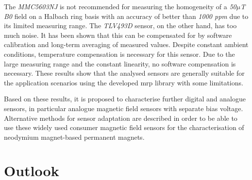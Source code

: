 The \emph{MMC5603NJ} is not recommended for measuring the homogeneity of
a \emph{50\(\mu\)T} \emph{B0} field on a Halbach ring basis with an
accuracy of better than \emph{1000 \gls{ppm}} due to its limited
measuring range. The \emph{TLV493D} sensor, on the other hand, has too
much noise. It has been shown that this can be compensated for by
software calibration and long-term averaging of measured values. Despite
constant ambient conditions, temperature compensation is necessary for
this sensor. Due to the large measuring range and the constant
linearity, no software compensation is necessary. These results show
that the analysed sensors are generally suitable for the application
scenarios using the developed \gls{mrp} library with some limitations.

Based on these results, it is proposed to characterise further digital
and analogue sensors, in particular analogue magnetic field sensors with
separate bias voltage. Alternative methods for sensor adaptation are
described in order to be able to use these widely used consumer magnetic
field sensors for the characterisation of neodymium magnet-based
permanent magnets.

\hypertarget{outlook}{%
\section{Outlook}\label{outlook}}

